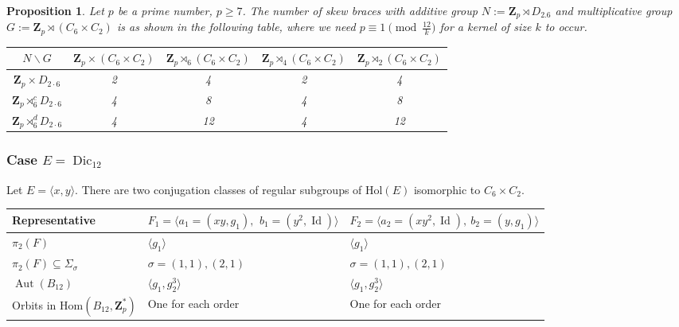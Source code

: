 \documentclass[12pt]{article}
\newtheorem{proposition}[theorem]{Proposition}
\theoremstyle{definition}
\newcommand{\Z}{\mathbf Z}
\newcommand{\Hol}{\mathrm{Hol}}
\newcommand{\Hom}{\mathrm{Hom}}
\newcommand{\Aut}{\operatorname{Aut}}
\newcommand{\Id}{\operatorname{Id}}
\newcommand{\Dic}{\operatorname{Dic}}
\begin{document}
\medskip

\begin{proposition}
	Let $p$ be a prime number, $p\geq 7$.
	The number of skew braces with additive group $N:=\Z_p \rtimes D_{2.6}$ and multiplicative group $G:=\Z_p\rtimes (C_6\times C_2)$ is as shown in the following table,
	where we need $p\equiv 1 \pmod{\frac {12}k}$ for a kernel of size $k$ to occur.
	
	\begin{center}
		\begin{tabular}{|c||c|c|c|c|}
			\hline
			$N \backslash G$ & $\Z_p\times (C_6\times C_2)$ & $\Z_p\rtimes_{6} (C_6\times C_2)$ & $\Z_p\rtimes_{4} (C_6\times C_2)$ & $\Z_p\rtimes_{2} (C_6\times C_2)$ \\
			\hline
			\hline
			$\Z_p \times D_{2\cdot 6}$ &2&4&2&4\\
			\hline
			$\Z_p \rtimes_{6}^c D_{2\cdot 6}$ &4&8&4&8\\
			\hline
			$\Z_p \rtimes_{6}^d D_{2\cdot 6}$ &4&12&4&12\\
			\hline
			
		\end{tabular}
	\end{center}
\end{proposition}



\subsubsection*{Case $E=\Dic_{12}$}

Let $E=\langle x,y\rangle$. There are two conjugation classes of regular subgroups of $\Hol(E)$ isomorphic to $C_6\times C_2$.

\begin{center}
    \begin{tabular}{|l|l|l|}
    \hline
      Representative& $F_1=\langle a_1=(xy,g_1),\ \,b_1=(y^2,\Id)\rangle$ & $F_2=\langle a_2=(xy^2,\Id),\ b_2=(y,g_1)\rangle$ \\    
      \hline
      $\pi_2(F)$ & $\langle g_1 \rangle $ &$\langle g_1\rangle$\\
      $\pi_2(F)\subseteq \Sigma_{\sigma}$ & $\sigma=(1,1),(2,1)$  &
      $\sigma=(1,1),(2,1)$\\
      $\Aut(B_{12})$ &$\langle g_1,g_2^3\rangle$ &$\langle g_1,g_2^3\rangle$\\
      Orbits in $\Hom(B_{12},\Z_p^*)$ & One for each order & One for each order \\
      \hline
    \end{tabular}
\end{center}    
\end{document}
